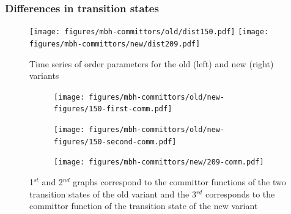 \documentclass{beamer}
\begin{document}
\begin{frame}
\frametitle{Differences in transition states}
\begin{figure}
\texttt{[image: figures/mbh-committors/old/dist150.pdf]}
\quad
\texttt{[image: figures/mbh-committors/new/dist209.pdf]}
\caption{Time series of order parameters for the old (left) and new (right) variants}
\end{figure}
%
\begin{figure}
     \centering
     \begin{subfigure}[b]{0.3\textwidth}
         \centering
         \texttt{[image: figures/mbh-committors/old/new-figures/150-first-comm.pdf]}
     \end{subfigure}
     \hfill
     \begin{subfigure}[b]{0.3\textwidth}
         \centering
         \texttt{[image: figures/mbh-committors/old/new-figures/150-second-comm.pdf]}
     \end{subfigure}
     \hfill
     \begin{subfigure}[b]{0.3\textwidth}
         \centering
         \texttt{[image: figures/mbh-committors/new/209-comm.pdf]}
     \end{subfigure}
        \caption{1$^{st}$ and 2$^{nd}$ graphs correspond to the committor functions of the two transition states of the 
        old variant and the 3$^{rd}$ corresponds to the committor function of the transition state of the new variant}
\end{figure}
%
%

%

\end{frame}
\end{document}
